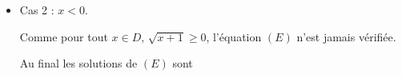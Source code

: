 \documentclass[a4paper, 11pt,reqno]{article}
\begin{document}
\begin{correction}
\begin{enumerate}
\begin{itemize}
\begin{center}
\end{center}
\item Cas 2 : $x<0$. 

Comme pour tout $x\in D, \, \sqrt{x+1} \geq 0$, l'équation $(E)$ n'est jamais vérifiée.  
\begin{center}

\end{center}

Au final les solutions de $(E)$ sont 

\begin{center}
\fbox{$\cS =\left[\frac{1+\sqrt{5}}{2},+\infty \right[$}
\end{center}



\end{itemize}





\end{enumerate}
\end{correction} 
\end{document}
